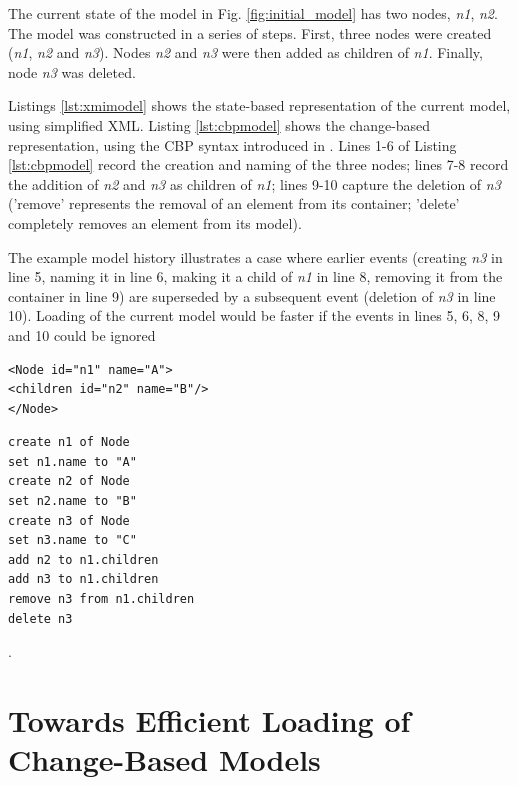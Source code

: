 \documentclass{llncs}
\begin{document}
    The current state of the model in Fig. \ref{fig:initial_model} has two nodes, \emph{n1}, \emph{n2}.  The model was constructed in a series of steps.  First, three nodes were created (\emph{n1}, \emph{n2} and \emph{n3}).
    Nodes \emph{n2} and \emph{n3} were then added as children of \emph{n1}.
    Finally, node \emph{n3} was deleted.
    
    Listings \ref{lst:xmimodel} shows the state-based representation of the current model, using simplified XML.  Listing \ref{lst:cbpmodel} shows the change-based representation, using the CBP syntax introduced in \cite{yohannis2017turning}. Lines 1-6 of Listing \ref{lst:cbpmodel} 
    record the creation and naming of the three nodes; lines 7-8 record the addition of \emph{n2} and \emph{n3} as children of \emph{n1}; lines 9-10 capture the deletion of \emph{n3} ('remove'   represents the removal of an element from its container; 'delete' completely removes an element from its model).
    
    The example model history illustrates a case where  earlier events (creating \emph{n3} in line 5, naming it in line 6, making it a child of \emph{n1} in line 8, removing it from the container in line 9) are superseded by a subsequent event (deletion of \emph{n3} in line 10).  Loading of the current model would be faster if the events in lines 5, 6, 8, 9 and 10 could be ignored
    
    \noindent
    \begin{minipage}[t]{0.5\linewidth}
\begin{lstlisting}[style=xmi,caption={State-based tree model.},label=lst:xmimodel]
<Node id="n1" name="A">
<children id="n2" name="B"/>
</Node>
\end{lstlisting}
    \end{minipage}
    \hfill
    \begin{minipage}[t]{0.5\linewidth}
\begin{lstlisting}[style=eol,caption={Change-based tree model.},label=lst:cbpmodel]
create n1 of Node
set n1.name to "A"      
create n2 of Node
set n2.name to "B"      
create n3 of Node
set n3.name to "C"      
add n2 to n1.children   
add n3 to n1.children
remove n3 from n1.children   
delete n3
\end{lstlisting}
    \end{minipage}
    
 .
    
    \section{Towards Efficient Loading of Change-Based Models}
    \label{sec:loading_time_optimisation}
    
\end{document}
